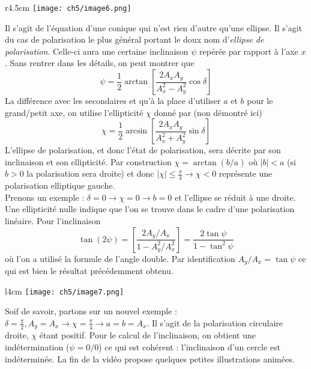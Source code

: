 		\begin{wrapfigure}[2]{r}{4.5cm}
	\vspace{-12mm}
	\texttt{[image: ch5/image6.png]}
	\end{wrapfigure}
	Il s'agit de l'équation d'une conique qui n'est rien d'autre qu'une ellipse. Il s'agit du cas de 
	polarisation le plus général portant le doux nom d'\textit{ellipse de polarisation}. Celle-ci aura 
	une certaine inclinaison $\psi$ repérée par rapport à l'axe $x$. Sans rentrer dans les détails, on 
	peut montrer que
	\begin{equation}
	\psi = \frac{1}{2}\arctan\left[\dfrac{2A_xA_y}{A_x^2-A_y^2}\cos\delta\right]
	\end{equation}
	La différence avec les secondaires et qu'à la place d'utiliser $a$ et $b$ pour le grand/petit axe, 
	on utilise l'ellipticité $\chi$ donné par (non démontré ici)
	\begin{equation}
	\chi = \frac{1}{2}\arcsin\left[\dfrac{2A_xA_y}{A_x^2+A_y^2}\sin\delta\right]
	\end{equation}
	L’ellipse de polarisation, et donc l'état de polarisation, sera décrite par son inclinaison et 
	son ellipticité. Par construction $\chi=\arctan(b/a)$ où $|b|<a$ (si $b>0$ la polarisation sera 
	droite) et donc $|\chi| \leq  \frac{\pi}{4} \rightarrow \chi <0$ représente une polarisation 
	elliptique gauche.\\
	
	Prenons un exemple : $\delta = 0\rightarrow \chi = 0\rightarrow b = 0$ et l'ellipse se réduit à 
	une droite. Une ellipticité nulle indique que l'on se trouve dans le cadre d'une polarisation 
	linéaire. Pour l'inclinaison 
	\begin{equation}
	\tan(2\psi) = \left[\frac{2A_y/A_x}{1-A_y^2/A_x^2}\right] = \dfrac{2\tan\psi}{1-\tan^2\psi}
	\end{equation}
	où l'on a utilisé la formule de l'angle double. Par identification $A_y/A_x = \tan\psi$ ce qui 
	est bien le résultat précédemment obtenu.\\
	
	\begin{wrapfigure}[6]{l}{4cm}
	\vspace{-9mm}
	\texttt{[image: ch5/image7.png]}
	\end{wrapfigure}
	Soif de savoir, partons sur un nouvel exemple : $\delta = \frac{\pi}{2}, A_y=A_x \rightarrow 
	\chi = \frac{\pi}{4}\rightarrow a=b=A_x$. Il s'agit de la polarisation circulaire droite, 
	$\chi$ étant positif. Pour le calcul de l'inclinaison, on obtient une indétermination ($\psi = 0/0$)
	ce qui est cohérent : l'inclinaison d'un cercle est indéterminée. La fin de la vidéo propose quelques 
	petites illustrations animées.
	
	
	
	
	
	
	
	
	
	
	
	
	
	
	
	
	
	
	
	
	
	
	
	
	
	
	
	
	